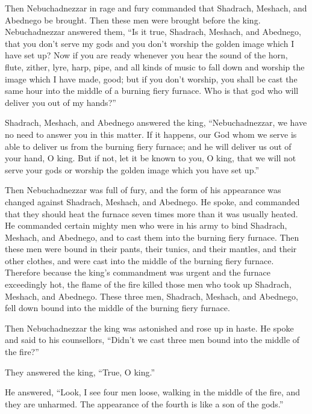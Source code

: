  Then Nebuchadnezzar in rage and fury commanded that
Shadrach, Meshach, and Abednego be brought. Then these men were brought
before the king.  Nebuchadnezzar answered them, ``Is it
true, Shadrach, Meshach, and Abednego, that you don't serve my gods and
you don't worship the golden image which I have set up? 
Now if you are ready whenever you hear the sound of the horn, flute,
zither, lyre, harp, pipe, and all kinds of music to fall down and
worship the image which I have made, good; but if you don't worship, you
shall be cast the same hour into the middle of a burning fiery furnace.
Who is that god who will deliver you out of my hands?''

 Shadrach, Meshach, and Abednego answered the king,
``Nebuchadnezzar, we have no need to answer you in this matter.
 If it happens, our God whom we serve is able to deliver us
from the burning fiery furnace; and he will deliver us out of your hand,
O king.  But if not, let it be known to you, O king, that
we will not serve your gods or worship the golden image which you have
set up.''

 Then Nebuchadnezzar was full of fury, and the form of his
appearance was changed against Shadrach, Meshach, and Abednego. He
spoke, and commanded that they should heat the furnace seven times more
than it was usually heated.  He commanded certain mighty
men who were in his army to bind Shadrach, Meshach, and Abednego, and to
cast them into the burning fiery furnace.  Then these men
were bound in their pants, their tunics, and their mantles, and their
other clothes, and were cast into the middle of the burning fiery
furnace.  Therefore because the king's commandment was
urgent and the furnace exceedingly hot, the flame of the fire killed
those men who took up Shadrach, Meshach, and Abednego. 
These three men, Shadrach, Meshach, and Abednego, fell down bound into
the middle of the burning fiery furnace.

 Then Nebuchadnezzar the king was astonished and rose up in
haste. He spoke and said to his counsellors, ``Didn't we cast three men
bound into the middle of the fire?''

They answered the king, ``True, O king.''

 He answered, ``Look, I see four men loose, walking in the
middle of the fire, and they are unharmed. The appearance of the fourth
is like a son of the gods.''

